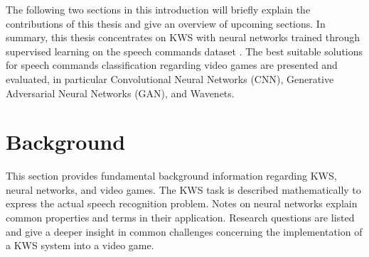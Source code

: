 The following two sections in this introduction will briefly explain the contributions of this thesis and give an overview of upcoming sections.
In summary, this thesis concentrates on KWS with neural networks trained through supervised learning on the speech commands dataset \cite{Warden2018}.
The best suitable solutions for speech commands classification regarding video games are presented and evaluated, in particular Convolutional Neural Networks (CNN), Generative Adversarial Neural Networks (GAN), and Wavenets.







\chapter{Background}\label{sec:back}
This section provides fundamental background information regarding KWS, neural networks, and video games.
The KWS task is described mathematically to express the actual speech recognition problem.
Notes on neural networks explain common properties and terms in their application.
Research questions are listed and give a deeper insight in common challenges concerning the implementation of a KWS system into a video game.






